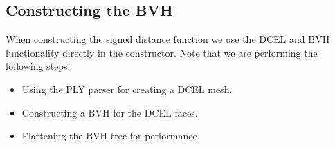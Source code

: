 \documentclass[letterpaper,10pt,english]{sphinxmanual}
\begin{document}
\begin{sphinxVerbatim}[commandchars=\\\{\}]
        
         
          

                         
         

   
   

   
\end{sphinxVerbatim}


\subsection{Constructing the BVH}
\label{\detokenize{Example_Chombo3:constructing-the-bvh}}
\sphinxAtStartPar
When constructing the signed distance function we use the DCEL and BVH functionality directly in the constructor.
Note that we are performing the following steps:
\begin{itemize}
\item {} 
\sphinxAtStartPar
Using the PLY parser for creating a DCEL mesh.

\item {} 
\sphinxAtStartPar
Constructing a BVH for the DCEL faces.

\item {} 
\sphinxAtStartPar
Flattening the BVH tree for performance.

\end{itemize}
\end{document}
